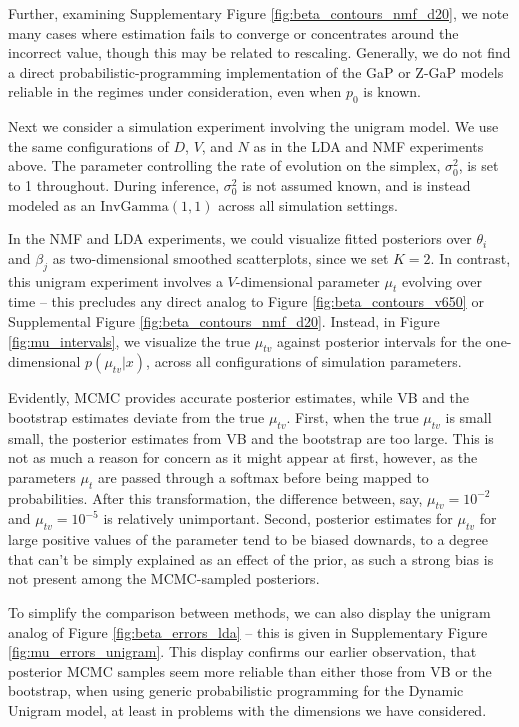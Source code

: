 \documentclass[oupdraft]{bio}
\begin{document}
Further, examining Supplementary Figure \ref{fig:beta_contours_nmf_d20}, we note
many cases where estimation fails to converge or concentrates around the
incorrect value, though this may be related to rescaling. Generally, we do not
find a direct probabilistic-programming implementation of the GaP or Z-GaP
models reliable in the regimes under consideration, even when $p_{0}$ is known.

Next we consider a simulation experiment involving the unigram model. We use the
same configurations of $D$, $V$, and $N$ as in the LDA and NMF experiments
above. The parameter controlling the rate of evolution on the simplex,
$\sigma_{0}^2$, is set to 1 throughout. During inference, $\sigma_0^2$ is not
assumed known, and is instead modeled as an $\text{InvGamma}\left(1, 1\right)$
across all simulation settings.

In the NMF and LDA experiments, we could visualize fitted posteriors over
$\theta_i$ and $\beta_j$ as two-dimensional smoothed scatterplots, since we set
$K = 2$. In contrast, this unigram experiment involves a $V$-dimensional
parameter $\mu_t$ evolving over time -- this precludes any direct analog to
Figure \ref{fig:beta_contours_v650} or Supplemental Figure
\ref{fig:beta_contours_nmf_d20}. Instead, in Figure \ref{fig:mu_intervals}, we
visualize the true $\mu_{tv}$ against posterior intervals for the
one-dimensional $p\left(\mu_{tv} \vert x\right)$, across all configurations of
simulation parameters.

Evidently, MCMC provides accurate posterior estimates, while VB and the
bootstrap estimates deviate from the true $\mu_{tv}$. First, when the true
$\mu_{tv}$ is small small, the posterior estimates from VB and the bootstrap are
too large. This is not as much a reason for concern as it might appear at first,
however, as the parameters $\mu_t$ are passed through a softmax before being
mapped to probabilities. After this transformation, the difference between, say,
$\mu_{tv} = 10^{-2}$ and $\mu_{tv} = 10^{-5}$ is relatively unimportant. Second,
posterior estimates for $\mu_{tv}$ for large positive values of the parameter
tend to be biased downards, to a degree that can't be simply explained as an
effect of the prior, as such a strong bias is not present among the MCMC-sampled
posteriors.

To simplify the comparison between methods, we can also display the unigram
analog of Figure \ref{fig:beta_errors_lda} -- this is given in Supplementary
Figure \ref{fig:mu_errors_unigram}. This display confirms our earlier
observation, that posterior MCMC samples seem more reliable than either those
from VB or the bootstrap, when using generic probabilistic programming for the
Dynamic Unigram model, at least in problems with the dimensions we have
considered.
\end{document}
